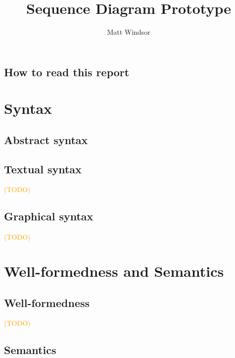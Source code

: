 \documentclass[a4paper]{memoir}
\title{\langname{} Sequence Diagram Prototype}
\author{Matt Windsor}
\newcommand{\todo}[1]{\textcolor{orange}{(#1)}}
\theoremstyle{definition}
\begin{document}
\pagestyle{sruled}

\frontmatter

\begin{titlingpage}
\setlength{\droptitle}{30pt}
\maketitle
\end{titlingpage}

\tableofcontents{}

\clearpage

\chapter*{How to read this report}


\mainmatter

\part{Syntax}

\chapter{Abstract syntax}


\chapter{Textual syntax}
\todo{TODO}

\chapter{Graphical syntax}
\todo{TODO}

\part{Well-formedness and Semantics}

\chapter{Well-formedness}
\todo{TODO}

\chapter{Semantics}

\end{document}
